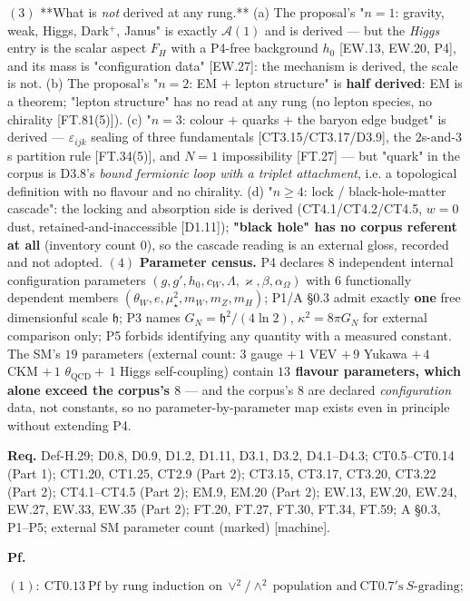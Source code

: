 \begin{theorem}
$(3)$ **What is \textit{not} derived at any rung.** (a) The proposal's "$n=1$: gravity, weak, Higgs, Dark$^+$, Janus" is exactly $\mathcal A(1)$ and is derived — but the \textit{Higgs} entry is the scalar aspect $F_H$ with a P4-free background $h_0$ [EW.13, EW.20, P4], and its mass is "configuration data" [EW.27]: the mechanism is derived, the scale is not. (b) The proposal's "$n=2$: EM $+$ lepton structure" is \textbf{half derived}: EM is a theorem; "lepton structure" has no read at any rung (no lepton species, no chirality [FT.81(5)]). (c) "$n=3$: colour $+$ quarks $+$ the baryon edge budget" is derived — $\varepsilon_{ijk}$ sealing of three fundamentals [CT3.15/CT3.17/D3.9], the $2$s-and-$3$s partition rule [FT.34(5)], and $N=1$ impossibility [FT.27] — but "quark" in the corpus is D3.8's \textit{bound fermionic loop with a triplet attachment}, i.e. a topological definition with no flavour and no chirality. (d) "$n\ge4$: lock / black-hole-matter cascade": the locking and absorption side is derived (CT4.1/CT4.2/CT4.5, $w=0$ dust, retained-and-inaccessible [D1.11]); \textbf{"black hole" has no corpus referent at all} (inventory count $0$), so the cascade reading is an external gloss, recorded and not adopted. $(4)$ \textbf{Parameter census.} P4 declares $8$ independent internal configuration parameters $(g,g',h_0,c_W,\Lambda,\varkappa,\beta,\alpha_\Omega)$ with $6$ functionally dependent members $(\theta_W,e,\mu_\star^2,m_W,m_Z,m_H)$; P1/A §0.3 admit exactly \textbf{one} free dimensionful scale $\mathfrak h$; P3 names $G_N=\mathfrak h^2/(4\ln2)$, $\kappa^2=8\pi G_N$ for external comparison only; P5 forbids identifying any quantity with a measured constant. The SM's $19$ parameters (external count: $3$ gauge $+\,1$ VEV $+\,9$ Yukawa $+\,4$ CKM $+\,1$ $\theta_{\mathrm{QCD}}+\,1$ Higgs self-coupling) contain \textbf{$13$ flavour parameters, which alone exceed the corpus's $8$} — and the corpus's $8$ are declared \textit{configuration} data, not constants, so no parameter-by-parameter map exists even in principle without extending P4.

\textbf{Req.} Def-H.29; D0.8, D0.9, D1.2, D1.11, D3.1, D3.2, D4.1–D4.3; CT0.5–CT0.14 (Part 1); CT1.20, CT1.25, CT2.9 (Part 2); CT3.15, CT3.17, CT3.20, CT3.22 (Part 2); CT4.1–CT4.5 (Part 2); EM.9, EM.20 (Part 2); EW.13, EW.20, EW.24, EW.27, EW.33, EW.35 (Part 2); FT.20, FT.27, FT.30, FT.34, FT.59; A §0.3, P1–P5; external SM parameter count (marked) [machine].

\textbf{Pf.}

\[
(1):\ \mathrm{CT0.13}\ \text{Pf by rung induction on}\ \vee^2/\wedge^2\ \text{population and}\ \mathrm{CT0.7}'\text{s}\ S\text{-grading};
\]


\end{theorem}
